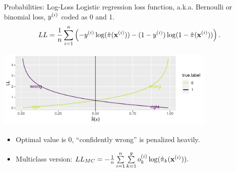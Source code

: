 \documentclass[11pt,compress,t,notes=noshow, xcolor=table]{beamer}
\newenvironment{knitrout}{}{} %
\begin{document}
\begin{vbframe}{Probabilities: Log-Loss}
Logistic regression loss function, a.k.a. Bernoulli or binomial loss, $y^{(i)}$ 
coded as 0 and 1.
\[
LL = \frac{1}{n} \sum\limits_{i=1}^n \left( - y^{(i)} \log(\hat \pi(\mathbf{x}^{(i)})) - (1-y^{(i)}) \log(1-\hat \pi(\mathbf{x}^{(i)})) \right).
\]
\begin{knitrout}\scriptsize
{}\color{fgcolor}

{\centering \includegraphics[width=0.8\textwidth]{figure/eval_mclass_2}  

}

\end{knitrout}
\begin{itemize}
  \item Optimal value is 0, \enquote{confidently wrong} is penalized heavily.
  \item Multiclass version: $ LL_{MC} = - \frac{1}{n} \sum\limits_{i=1}^n \sum\limits_{k=1}^g o_k^{(i)} 
  \log(\hat \pi_{k}(\mathbf{x}^{(i)})).$
\end{itemize}
\end{vbframe}


\endlecture
\end{document}
